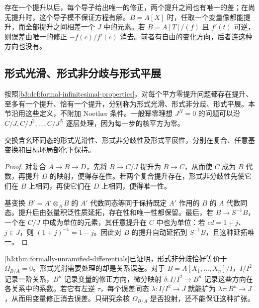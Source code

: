 存在一个提升以后，每个导子给出唯一的修正，两个提升之间也有唯一的差；在尚无提升时，这个导子模不保证方程有解。\(B=A[X]\) 时，任取一个变量像都能提升，而全部提升之间相差一个 \(J\) 中的元素。若 \(B=A[T]/(f)\) 且 \(f'(t)\) 可逆，则误差由唯一的修正 \(-f(c)/f'(c)\) 消去。前者有自由的变化方向，后者连这种方向也没有。

\subsection{形式光滑、形式非分歧与形式平展}
\label{b3:subsec:2302:02}

按照\cref{b3:def:formal-infinitesimal-properties}，对每个平方零提升问题都存在提升、至多有一个提升、恰有一个提升，分别称为形式光滑、形式非分歧、形式平展。本节沿用这些定义，不附加 Noether 条件。一般幂零理想 \(J^N=0\) 的问题可以沿 \(C/J,C/J^2,\ldots,C/J^N\) 逐层处理，因为每一步的核平方为零。

\begin{proposition}\label{b3:prop:formal-properties-stability}
	交换含幺环同态的形式光滑性、形式非分歧性及形式平展性，分别在复合、任意基变换和目标环局部化下保持。
\end{proposition}
\begin{proof}
	对复合 \(A\to B\to D\)，先将 \(B\to C/J\) 提升为 \(B\to C\)，从而使 \(C\) 成为 \(B\) 代数，再提升 \(D\) 的映射，便得存在性。若两个复合提升存在，形式非分歧性先使它们在 \(B\) 上相同，再使它们在 \(D\) 上相同，便得唯一性。

	基变换 \(B'=A'\otimes_AB\) 的 \(A'\) 代数同态等同于保持既定 \(A'\) 作用的 \(B\) 的 \(A\) 代数同态。提升后由张量积泛性质延拓，存在性和唯一性都保留。最后，若 \(B\to S^{-1}B\)，一个在 \(C/J\) 中成为单位的元素，其任意提升在 \(C\) 中也为单位：若 \(cd=1+j\)、\(j\in J\)，则 \((1+j)^{-1}=1-j\)。因此对 \(B\) 的提升自动延拓到 \(S^{-1}B\)，且这种延拓唯一。
\end{proof}

\cref{b3:thm:formally-unramified-differentials}已证明，形式非分歧恰好等价于 \(\Omega_{B/A}=0\)。形式光滑需要处理的却是关系误差。对于 \(B=A[X_1,\ldots,X_n]/I\)，\(I/I^2\) 记录一阶关系，\(B^n\) 记录变量的修正方向，微分映射 \(\delta:I/I^2\to B^n\) 记录这些方向在各关系中的系数。若它有左逆 \(\tau\)，每个误差同态 \(\lambda:I/I^2\to J\) 就能扩为 \(\lambda\tau:B^n\to J\)，从而用变量修正消去误差。只研究余核 \(\Omega_{B/A}\) 是否投射，还不能保证这种扩张。

